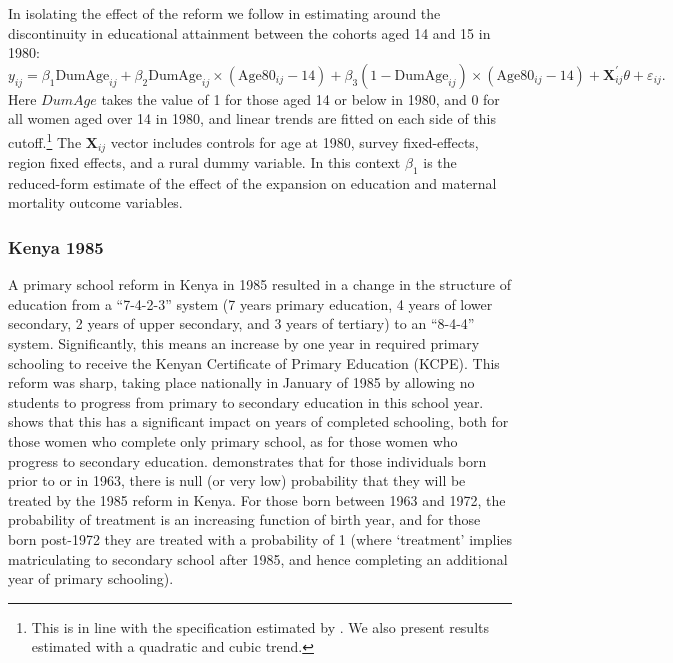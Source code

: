 \documentclass{article}[12pt,subeqn]
\begin{document}
\begin{spacing}{1.4}
In isolating the effect of the reform we follow \citet{AgueroBharawadj2011} in 
estimating around the discontinuity in educational attainment between the cohorts 
aged 14 and 15 in 1980: 
\begin{equation}
\label{eqn:Zimbabwe}
    y_{ij}=\beta_1\text{DumAge}_{ij}+
    \beta_2\text{DumAge}_{ij}\times(\text{Age}80_{ij}-14)+
    \beta_3(1-\text{DumAge}_{ij})\times(\text{Age}80_{ij}-14)+ 
    \textbf{X}^\prime_{ij}\theta+\varepsilon_{ij}.
\end{equation}
Here $DumAge$ takes the value of 1 for those aged 14 or below in 1980, and 0 for 
all women aged over 14 in 1980, and linear trends are fitted on each side of this 
cutoff.\footnote{This is in line with the specification estimated by 
\citet{AgueroBharawadj2011}.  We also present results estimated with a quadratic 
and cubic trend.} The $\textbf{X}_{ij}$ vector includes controls for age at 1980, 
survey fixed-effects, region fixed effects, and a rural dummy variable.  In this 
context $\beta_1$ is the reduced-form estimate of the effect of the expansion on 
education and maternal mortality outcome variables.

\subsubsection{Kenya 1985}
\label{ssscn:empiricsKenya}
A primary school reform in Kenya in 1985 resulted in a change in the structure of 
education from a ``7-4-2-3'' system (7 years primary education, 4 years of lower 
secondary, 2 years of upper secondary, and 3 years of tertiary) to an ``8-4-4'' 
system. Significantly, this means an increase by one year in required primary 
schooling to receive the Kenyan Certificate of Primary Education (KCPE). This 
reform was sharp, taking place nationally in January of 1985 by allowing no 
students to progress from primary to secondary education in this school 
year. \citet{Chicoine2011} shows that this has a significant impact on years of 
completed schooling, both for those women who complete only primary school, as for 
those women who progress to secondary education. \citet{Chicoine2011} demonstrates 
that for those individuals born prior to or in 1963, there is null (or very low)
probability that they will be treated by the 1985 reform in Kenya. For those born 
between 1963 and 1972, the probability of treatment is an increasing function of 
birth year, and for those born post-1972 they are treated with a probability of 1 
(where `treatment' implies matriculating to secondary school after 1985, and hence 
completing an additional year of primary schooling).


\end{spacing}
\end{document}
